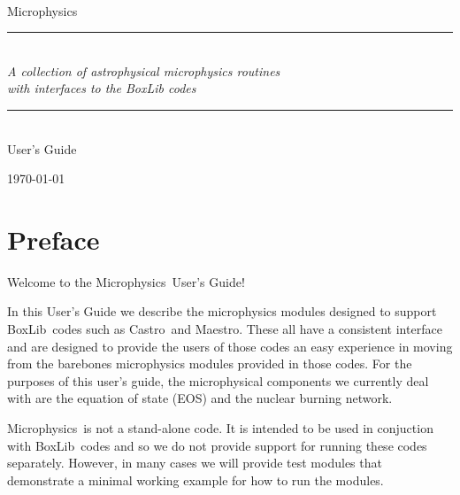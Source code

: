 \documentclass[11pt]{book}
\newcommand{\HRule}{\rule{\linewidth}{0.125mm}}
\renewcommand{\chaptermark}[1]{%
 \markboth{\chaptername
\ \thechapter.\ #1}{}}
\newcommand{\castro}{{\sf Castro}}
\newcommand{\maestro}{{\sf Maestro}}
\newcommand{\boxlib}{{\sf BoxLib}}
\newcommand{\microphysics}{{\sf Microphysics}}
\begin{document}
\frontmatter

\begin{titlepage}
\begin{center}
\ \\[3in]
{\sf \Huge Microphysics} 

\begin{minipage}{5.5in}
\HRule\\[2mm]
\centering
{\Large \em A collection of astrophysical microphysics routines \\ with interfaces to the BoxLib codes}

\HRule
\end{minipage}

\ \\[1 in]
{\sf \huge User's Guide}

\vfill

{\large \today}
\end{center}

\end{titlepage}



\setcounter{tocdepth}{2}
\tableofcontents

\clearpage

\chapter*{Preface}
\chaptermark{Preface}

Welcome to the \microphysics\ User's Guide!

In this User's Guide we describe the microphysics modules designed to support \boxlib\ 
codes such as \castro\ and \maestro. These all have a consistent interface and 
are designed to provide the users of those codes an easy experience in moving from 
the barebones microphysics modules provided in those codes. For the purposes of this 
user's guide, the microphysical components we currently deal with are the equation 
of state (EOS) and the nuclear burning network.

\microphysics\ is not a stand-alone code. It is intended to be used in conjuction with 
\boxlib\ codes and so we do not provide support for running these codes separately. 
However, in many cases we will provide test modules that demonstrate a minimal working 
example for how to run the modules.

\clearpage

\mainmatter
\end{document}
